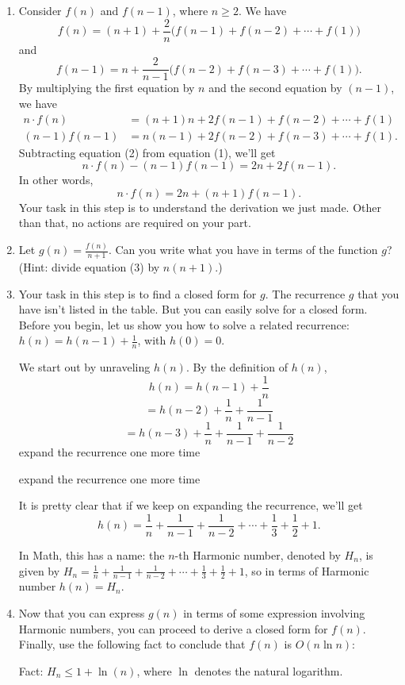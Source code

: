 \documentclass{article}
\theoremstyle{remark}
\begin{document}
\begin{enumerate}
    \item[(i)] Consider $f(n)$ and $f(n - 1)$, where $n \ge 2$. We have
    \[
        f(n) = (n + 1) + \frac{2}{n} \bigl(f(n - 1) + f(n - 2) + \cdots + f(1)\bigr)
    \]
    and
    \[
        f(n - 1) = n + \frac{2}{n - 1} \bigl(f(n - 2) + f(n - 3) + \cdots + f(1)\bigr).
    \]
    By multiplying the first equation by $n$ and the second equation by $(n - 1)$, we have
    \begin{align}
        n \cdot f(n) &= (n + 1)n + 2 f(n - 1) + f(n - 2) + \cdots + f(1) \tag{1} \\
        (n - 1) f(n - 1) &= n(n - 1) + 2 f(n - 2) + f(n - 3) + \cdots + f(1). \tag{2}
    \end{align}
    Subtracting equation (2) from equation (1), we'll get
    \[
        n \cdot f(n) - (n - 1) f(n - 1) = 2n + 2 f(n - 1).
    \]
    In other words,
    \[
        n \cdot f(n) = 2n + (n + 1) f(n - 1). \tag{3}
    \]
    Your task in this step is to understand the derivation we just made. Other than that, no actions are required on your part.

    \item[(ii)] Let $g(n) = \frac{f(n)}{n + 1}$. Can you write what you have in terms of the function $g$? (Hint: divide equation (3) by $n(n + 1)$.)

    \item[(iii)] Your task in this step is to find a closed form for $g$. The recurrence $g$ that you have isn't listed in the table. But you can easily solve for a closed form. Before you begin, let us show you how to solve a related recurrence: $h(n) = h(n - 1) + \frac{1}{n}$, with $h(0) = 0$.

    We start out by unraveling $h(n)$. By the definition of $h(n)$,
    \[
        h(n) = h(n - 1) + \frac{1}{n}
    \]
    \[
        = h(n - 2) + \frac{1}{n} + \frac{1}{n - 1}
    \]
    \[
        = h(n - 3) + \frac{1}{n} + \frac{1}{n - 1} + \frac{1}{n - 2}
    \]
    expand the recurrence one more time

    expand the recurrence one more time

    It is pretty clear that if we keep on expanding the recurrence, we'll get
    \[
        h(n) = \frac{1}{n} + \frac{1}{n - 1} + \frac{1}{n - 2} + \cdots + \frac{1}{3} + \frac{1}{2} + 1.
    \]

    In Math, this has a name: the $n$-th Harmonic number, denoted by $H_n$, is given by $H_n = \frac{1}{n} + \frac{1}{n - 1} + \frac{1}{n - 2} + \cdots + \frac{1}{3} + \frac{1}{2} + 1$, so in terms of Harmonic number $h(n) = H_n$.

    \item[(iv)] Now that you can express $g(n)$ in terms of some expression involving Harmonic numbers, you can proceed to derive a closed form for $f(n)$. Finally, use the following fact to conclude that $f(n)$ is $O(n \ln n)$:

    Fact: $H_n \le 1 + \ln(n)$, where $\ln$ denotes the natural logarithm.
\end{enumerate}
\end{document}
